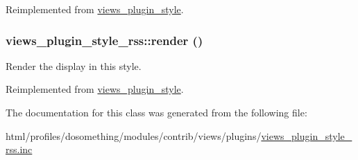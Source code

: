 Reimplemented from \hyperlink{classviews__plugin__style_afe3d437ff4398315b15c4e60975dbb1c}{views\_\-plugin\_\-style}.\hypertarget{classviews__plugin__style__rss_aa6331538ac5b9cdc80478f98ba5e0de4}{
\subsubsection[{render}]{\setlength{\rightskip}{0pt plus 5cm}views\_\-plugin\_\-style\_\-rss::render ()}}
\label{classviews__plugin__style__rss_aa6331538ac5b9cdc80478f98ba5e0de4}
Render the display in this style. 

Reimplemented from \hyperlink{classviews__plugin__style_aa52b618e91b11a7d10ad1feadbc891f1}{views\_\-plugin\_\-style}.

The documentation for this class was generated from the following file:\begin{DoxyCompactItemize}
\item 
html/profiles/dosomething/modules/contrib/views/plugins/\hyperlink{views__plugin__style__rss_8inc}{views\_\-plugin\_\-style\_\-rss.inc}\end{DoxyCompactItemize}
